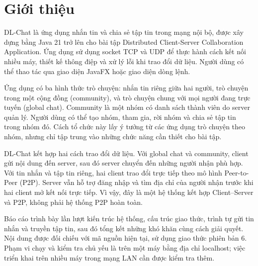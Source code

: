 \section{Giới thiệu}

DL-Chat là ứng dụng nhắn tin và chia sẻ tập tin trong mạng nội bộ, được xây dựng
bằng Java 21 trở lên cho bài tập Distributed Client-Server Collaboration Application.
Ứng dụng sử dụng socket TCP và UDP để thực hành cách kết nối nhiều máy,
thiết kế thông điệp và xử lý lỗi khi trao đổi dữ liệu. Người dùng có thể thao tác
qua giao diện JavaFX hoặc giao diện dòng lệnh.

Ứng dụng có ba hình thức trò chuyện: nhắn tin riêng giữa hai người, trò chuyện
trong một cộng đồng (community), và trò chuyện chung với mọi người đang trực tuyến
(global chat). Community là một nhóm có danh sách thành viên do server quản lý.
Người dùng có thể tạo nhóm, tham gia, rời nhóm và chia sẻ tập tin trong nhóm đó.
Cách tổ chức này lấy ý tưởng từ các ứng dụng trò chuyện theo nhóm, nhưng chỉ tập
trung vào những chức năng cần thiết cho bài tập.

DL-Chat kết hợp hai cách trao đổi dữ liệu. Với global chat và community, client
gửi nội dung đến server, sau đó server chuyển đến những người nhận phù hợp.
Với tin nhắn và tập tin riêng, hai client trao đổi trực tiếp theo mô hình
Peer-to-Peer (P2P). Server vẫn hỗ trợ đăng nhập và tìm địa chỉ của người nhận trước
khi hai client mở kết nối trực tiếp. Vì vậy, đây là một hệ thống kết hợp
Client--Server và P2P, không phải hệ thống P2P hoàn toàn.

Báo cáo trình bày lần lượt kiến trúc hệ thống, cấu trúc giao thức, trình tự gửi
tin nhắn và truyền tập tin, sau đó tổng kết những khó khăn cùng cách giải quyết.
Nội dung được đối chiếu với mã nguồn hiện tại, sử dụng giao thức phiên bản 6.
Phạm vi chạy và kiểm tra chủ yếu là trên một máy bằng địa chỉ localhost;
việc triển khai trên nhiều máy trong mạng LAN cần được kiểm tra thêm.
